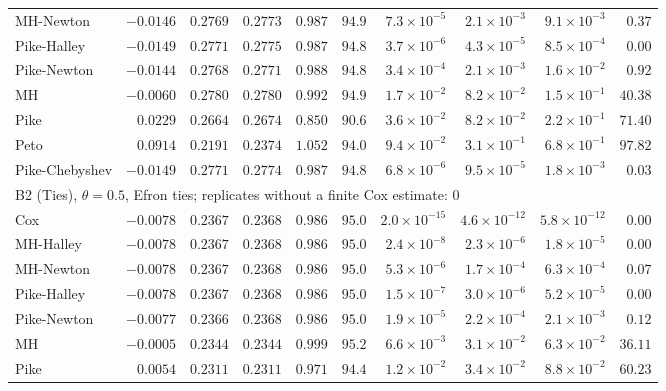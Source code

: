 \begin{landscape}
\begin{longtable}{lrrrrrrrrr}
MH-Newton & $-0.0146$ & $0.2769$ & $0.2773$ & $0.987$ & $94.9$ & $7.3 \times 10^{-5}$ & $2.1 \times 10^{-3}$ & $9.1 \times 10^{-3}$ & $0.37$ \\
Pike-Halley & $-0.0149$ & $0.2771$ & $0.2775$ & $0.987$ & $94.8$ & $3.7 \times 10^{-6}$ & $4.3 \times 10^{-5}$ & $8.5 \times 10^{-4}$ & $0.00$ \\
Pike-Newton & $-0.0144$ & $0.2768$ & $0.2771$ & $0.988$ & $94.8$ & $3.4 \times 10^{-4}$ & $2.1 \times 10^{-3}$ & $1.6 \times 10^{-2}$ & $0.92$ \\
MH & $-0.0060$ & $0.2780$ & $0.2780$ & $0.992$ & $94.9$ & $1.7 \times 10^{-2}$ & $8.2 \times 10^{-2}$ & $1.5 \times 10^{-1}$ & $40.38$ \\
Pike & $0.0229$ & $0.2664$ & $0.2674$ & $0.850$ & $90.6$ & $3.6 \times 10^{-2}$ & $8.2 \times 10^{-2}$ & $2.2 \times 10^{-1}$ & $71.40$ \\
Peto & $0.0914$ & $0.2191$ & $0.2374$ & $1.052$ & $94.0$ & $9.4 \times 10^{-2}$ & $3.1 \times 10^{-1}$ & $6.8 \times 10^{-1}$ & $97.82$ \\
Pike-Chebyshev & $-0.0149$ & $0.2771$ & $0.2774$ & $0.987$ & $94.8$ & $6.8 \times 10^{-6}$ & $9.5 \times 10^{-5}$ & $1.8 \times 10^{-3}$ & $0.03$ \\
\multicolumn{10}{l}{B2 (Ties), $\theta = 0.5$, Efron ties; replicates without a finite Cox estimate: 0} \\
Cox & $-0.0078$ & $0.2367$ & $0.2368$ & $0.986$ & $95.0$ & $2.0 \times 10^{-15}$ & $4.6 \times 10^{-12}$ & $5.8 \times 10^{-12}$ & $0.00$ \\
MH-Halley & $-0.0078$ & $0.2367$ & $0.2368$ & $0.986$ & $95.0$ & $2.4 \times 10^{-8}$ & $2.3 \times 10^{-6}$ & $1.8 \times 10^{-5}$ & $0.00$ \\
MH-Newton & $-0.0078$ & $0.2367$ & $0.2368$ & $0.986$ & $95.0$ & $5.3 \times 10^{-6}$ & $1.7 \times 10^{-4}$ & $6.3 \times 10^{-4}$ & $0.07$ \\
Pike-Halley & $-0.0078$ & $0.2367$ & $0.2368$ & $0.986$ & $95.0$ & $1.5 \times 10^{-7}$ & $3.0 \times 10^{-6}$ & $5.2 \times 10^{-5}$ & $0.00$ \\
Pike-Newton & $-0.0077$ & $0.2366$ & $0.2368$ & $0.986$ & $95.0$ & $1.9 \times 10^{-5}$ & $2.2 \times 10^{-4}$ & $2.1 \times 10^{-3}$ & $0.12$ \\
MH & $-0.0005$ & $0.2344$ & $0.2344$ & $0.999$ & $95.2$ & $6.6 \times 10^{-3}$ & $3.1 \times 10^{-2}$ & $6.3 \times 10^{-2}$ & $36.11$ \\
Pike & $0.0054$ & $0.2311$ & $0.2311$ & $0.971$ & $94.4$ & $1.2 \times 10^{-2}$ & $3.4 \times 10^{-2}$ & $8.8 \times 10^{-2}$ & $60.23$ \\

\end{longtable}
\end{landscape}
